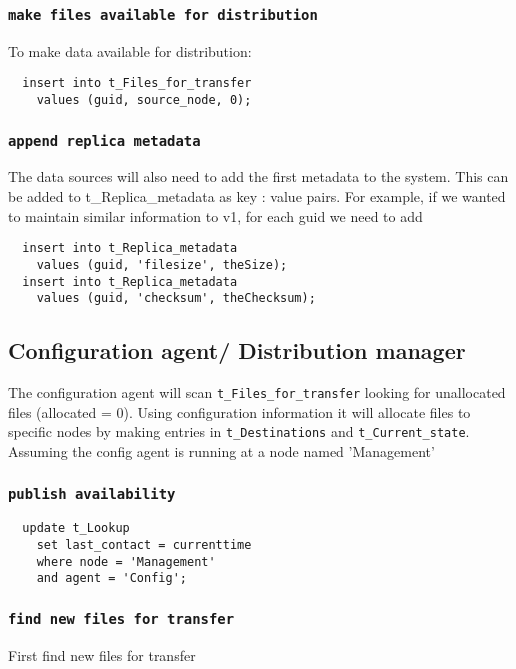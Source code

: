 \documentclass{cmspaper}
\begin{document}
\subsubsection{\textbf{\texttt{make files available for distribution}}}
To make data available for distribution:

{\small\begin{verbatim}
  insert into t_Files_for_transfer
    values (guid, source_node, 0);
\end{verbatim}}

\subsubsection{\textbf{\texttt{append replica metadata}}}
The data sources will also need to add the first metadata to the system. This can be added to t\_Replica\_metadata as key : value pairs. For example, if we wanted to maintain similar information to v1, for each guid we need to add

{\small\begin{verbatim}
  insert into t_Replica_metadata
    values (guid, 'filesize', theSize);
  insert into t_Replica_metadata
    values (guid, 'checksum', theChecksum);
\end{verbatim}}


\subsection{Configuration agent/ Distribution manager}

The configuration agent will scan \texttt{t\_Files\_for\_transfer}
looking for unallocated files (allocated = 0).  Using configuration
information it will allocate files to specific nodes by making entries
in \texttt{t\_Destinations} and \texttt{t\_Current\_state}. Assuming the config agent is running at a node named 'Management'

\subsubsection{\textbf{\texttt{publish availability}}}

{\small\begin{verbatim}
  update t_Lookup
    set last_contact = currenttime
    where node = 'Management'
    and agent = 'Config';
\end{verbatim}}

\subsubsection{\textbf{\texttt{find new files for transfer}}}
First find new files for transfer
\end{document}
